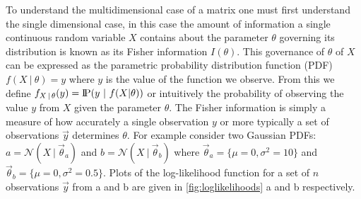 To understand the multidimensional case of a matrix one must first understand the single dimensional case, in this case the amount of information a single continuous random variable $X$ contains about the parameter $\theta$ governing its distribution is known as its Fisher information $I(\theta)$. This governance of $\theta$ of $X$ can be expressed as the parametric probability distribution function (PDF) $f(X\ |\ \theta) = y$ where $y$ is the value of the function we observe. From this we define $f_{X\,|\,\theta}(y) = \probP(y\ |\ f(X|\theta))$ or intuitively the probability of observing the value $y$ from $X$ given the parameter $\theta$. The Fisher information is simply a measure of how accurately a single observation $y$ or more typically a set of observations $\vec{y}$ determines $\theta$. For example consider two Gaussian PDFs: $a = \mathcal{N}(X\ |\ \vec{\theta}_a)$ and $b = \mathcal{N}(X\ |\ \vec{\theta}_b)$ where $\vec{\theta}_a = \{\mu=0, \sigma^2=10\}$ and $\vec{\theta}_b = \{\mu=0,\sigma^2=0.5\}$. Plots of the log-likelihood function for a set of $n$ observations $\vec{y}$ from a and b are given in \cref{fig:loglikelihoods} a and b respectively.
